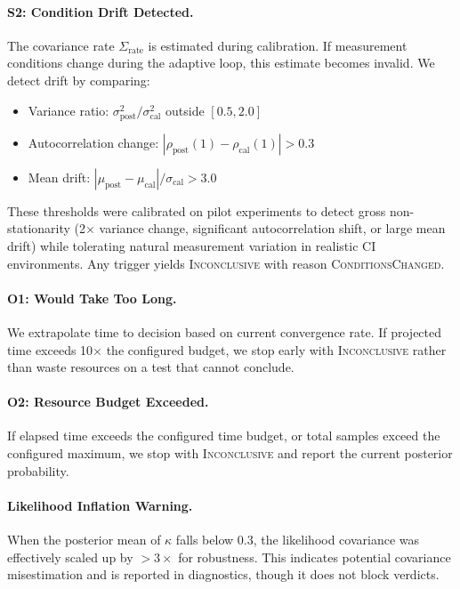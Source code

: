 \documentclass[letterpaper,twocolumn,10pt]{article}
\begin{document}
\paragraph{S2: Condition Drift Detected.}
The covariance rate $\Sigma_{\text{rate}}$ is estimated during calibration. If measurement conditions change during the adaptive loop, this estimate becomes invalid. We detect drift by comparing:
\begin{itemize}
\item Variance ratio: $\sigma_{\text{post}}^2 / \sigma_{\text{cal}}^2$ outside $[0.5, 2.0]$
\item Autocorrelation change: $|\rho_{\text{post}}(1) - \rho_{\text{cal}}(1)| > 0.3$
\item Mean drift: $|\mu_{\text{post}} - \mu_{\text{cal}}| / \sigma_{\text{cal}} > 3.0$
\end{itemize}
These thresholds were calibrated on pilot experiments to detect gross non-stationarity (2$\times$ variance change, significant autocorrelation shift, or large mean drift) while tolerating natural measurement variation in realistic CI environments. Any trigger yields \textsc{Inconclusive} with reason \textsc{ConditionsChanged}.

\paragraph{O1: Would Take Too Long.}
We extrapolate time to decision based on current convergence rate. If projected time exceeds 10$\times$ the configured budget, we stop early with \textsc{Inconclusive} rather than waste resources on a test that cannot conclude.

\paragraph{O2: Resource Budget Exceeded.}
If elapsed time exceeds the configured time budget, or total samples exceed the configured maximum, we stop with \textsc{Inconclusive} and report the current posterior probability.

\paragraph{Likelihood Inflation Warning.}
When the posterior mean of $\kappa$ falls below 0.3, the likelihood covariance was effectively scaled up by $>3\times$ for robustness. This indicates potential covariance misestimation and is reported in diagnostics, though it does not block verdicts.
\end{document}
